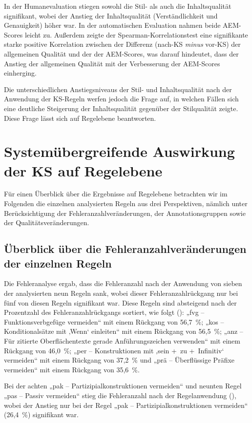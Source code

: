 In der Humanevaluation stiegen sowohl die Stil- als auch die Inhaltsqualität signifikant, wobei der Anstieg der Inhaltsqualität (Verständlichkeit und Genauigkeit) höher war. In der automatischen Evaluation nahmen beide AEM-Scores leicht zu. Außerdem zeigte der Spearman-Korrelationstest eine signifikante starke positive Korrelation zwischen der Differenz (nach-KS \textit{minus} vor-KS) der allgemeinen Qualität und der der AEM-Scores, was darauf hindeutet, dass der Anstieg der allgemeinen Qualität mit der Verbesserung der AEM-Scores einherging.

Die unterschiedlichen Anstiegsniveaus der Stil- und Inhaltsqualität nach der Anwendung der KS-Regeln werfen jedoch die Frage auf, in welchen Fällen sich eine deutliche Steigerung der Inhaltsqualität gegenüber der Stilqualität zeigte. Diese Frage lässt sich auf Regelebene beantworten.

\section{\label{sec:6.2}Systemübergreifende Auswirkung der KS auf Regelebene}

Für einen Überblick über die Ergebnisse auf Regelebene betrachten wir im Folgenden die einzelnen analysierten Regeln aus drei Perspektiven, nämlich unter Berücksichtigung der Fehleranzahlveränderungen, der Annotationsgruppen sowie der Qualitätsveränderungen.

\subsection{Überblick über die Fehleranzahlveränderungen der einzelnen Regeln}
Die Fehleranalyse ergab, dass die Fehleranzahl nach der Anwendung von sieben der analysierten neun Regeln sank, wobei dieser Fehleranzahlrückgang nur bei fünf von diesen Regeln signifikant war. Diese Regeln sind absteigend nach der Prozentzahl des Fehleranzahlrückgangs sortiert, wie folgt (): „fvg -- Funktionsverbgefüge vermeiden“ mit einem Rückgang von 56,7~\%; „kos -- Konditionalsätze mit ‚Wenn‘ einleiten“ mit einem Rückgang von 56,5~\%; „anz -- Für zitierte Oberflächentexte gerade Anführungszeichen verwenden“ mit einem Rückgang von 46,0~\%; „per -- Konstruktionen mit ‚sein +~zu +~Infinitiv‘ vermeiden“ mit einem Rückgang von 37,2~\% und „prä -- Überflüssige Präfixe vermeiden“ mit einem Rückgang von 35,6~\%.

Bei der achten „pak -- Partizipialkonstruktionen vermeiden“ und neunten Regel „pas -- Passiv vermeiden“ stieg die Fehleranzahl nach der Regelanwendung (), wobei der Anstieg nur bei der Regel „pak -- Partizipialkonstruktionen vermeiden“ (26,4~\%) signifikant war.

